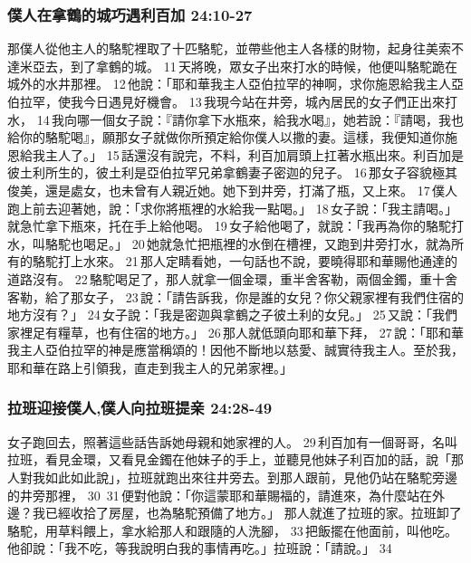 \subsubsection{僕人在拿鶴的城巧遇利百加 24:10-27} 
那僕人從他主人的駱駝裡取了十匹駱駝，並帶些他主人各樣的財物，起身往美索不達米亞去，到了拿鶴的城。 11 天將晚，眾女子出來打水的時候，他便叫駱駝跪在城外的水井那裡。 12 他說：「耶和華我主人亞伯拉罕的神啊，求你施恩給我主人亞伯拉罕，使我今日遇見好機會。 13 我現今站在井旁，城內居民的女子們正出來打水， 14 我向哪一個女子說：『請你拿下水瓶來，給我水喝』，她若說：『請喝，我也給你的駱駝喝』，願那女子就做你所預定給你僕人以撒的妻。這樣，我便知道你施恩給我主人了。」 15 話還沒有說完，不料，利百加肩頭上扛著水瓶出來。利百加是彼土利所生的，彼土利是亞伯拉罕兄弟拿鶴妻子密迦的兒子。 16 那女子容貌極其俊美，還是處女，也未曾有人親近她。她下到井旁，打滿了瓶，又上來。 17 僕人跑上前去迎著她，說：「求你將瓶裡的水給我一點喝。」 18 女子說：「我主請喝。」就急忙拿下瓶來，托在手上給他喝。 19 女子給他喝了，就說：「我再為你的駱駝打水，叫駱駝也喝足。」 20 她就急忙把瓶裡的水倒在槽裡，又跑到井旁打水，就為所有的駱駝打上水來。 21 那人定睛看她，一句話也不說，要曉得耶和華賜他通達的道路沒有。 22 駱駝喝足了，那人就拿一個金環，重半舍客勒，兩個金鐲，重十舍客勒，給了那女子， 23 說：「請告訴我，你是誰的女兒？你父親家裡有我們住宿的地方沒有？」 24 女子說：「我是密迦與拿鶴之子彼土利的女兒。」 25 又說：「我們家裡足有糧草，也有住宿的地方。」 26 那人就低頭向耶和華下拜， 27 說：「耶和華我主人亞伯拉罕的神是應當稱頌的！因他不斷地以慈愛、誠實待我主人。至於我，耶和華在路上引領我，直走到我主人的兄弟家裡。」




\subsubsection{拉班迎接僕人,僕人向拉班提亲 24:28-49}  
女子跑回去，照著這些話告訴她母親和她家裡的人。 29 利百加有一個哥哥，名叫拉班，看見金環，又看見金鐲在他妹子的手上，並聽見他妹子利百加的話，說「那人對我如此如此說」，拉班就跑出來往井旁去。到那人跟前，見他仍站在駱駝旁邊的井旁那裡， 30  31 便對他說：「你這蒙耶和華賜福的，請進來，為什麼站在外邊？我已經收拾了房屋，也為駱駝預備了地方。」
那人就進了拉班的家。拉班卸了駱駝，用草料餵上，拿水給那人和跟隨的人洗腳， 33 把飯擺在他面前，叫他吃。他卻說：「我不吃，等我說明白我的事情再吃。」拉班說：「請說。」 34 


